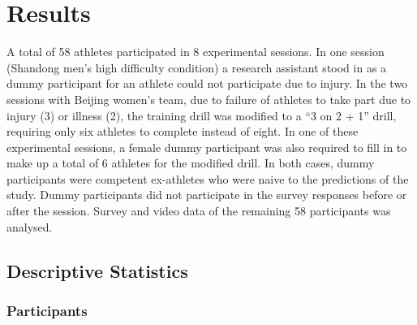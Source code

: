 \documentclass[english]{article}\usepackage[]{graphicx}\usepackage[]{color}
\begin{document}


















\section{Results}
A total of 58 athletes participated in 8 experimental sessions. In one session (Shandong men's high difficulty condition) a research assistant stood in as a dummy participant for an athlete could not participate due to injury.  In the two sessions with Beijing women's team, due to failure of athletes to take part due to injury (3) or illness (2), the training drill was modified to a ``3 on 2 + 1'' drill, requiring only six athletes to complete instead of eight. In one of these experimental sessions, a female dummy participant was also required to fill in to make up a total of 6 athletes for the modified drill.  In both cases, dummy participants were competent ex-athletes who were naive to the predictions of the study.  Dummy participants did not participate in the survey responses before or after the session. Survey and video data of the remaining 58 participants was analysed.






\subsection{Descriptive Statistics}

\subsubsection{Participants}
\end{document}
